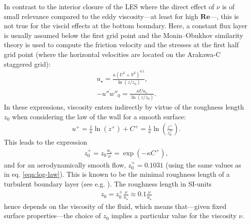 \documentclass[a4paper,11pt]{article}
\newcommand{\RE}{\mathbf{Re}}
\begin{document}
\label{low-bound}

In contrast to the interior closure of the LES where the direct effect of $\nu$ is of small relevance compared to the eddy viscosity---at least for high $\RE$---, this is not true for the viscid effects at the bottom boundary. Here, a constant flux layer is usually assumed below the first grid point and the Monin--Obukhov similarity theory is used to compute the friction velocity and the stresses at the first half grid point (where the horizontal velocities are located on the Arakawa-C staggered grid):
\begin{align}\label{most}
  u_\star = \frac{\kappa(U^2+V^2)^{0.5}}{\ln\left(z/z_0\right)},\\
  -\overline{u''w''}_0 = \frac{\kappa Uu_\star}{\ln\left(z/z_0\right)}.
\end{align}
In these expressions, viscosity enters indirectly by virtue of the roughness length $z_0$ when considering the law of the wall for a smooth surface:
\begin{align}
  u^+ = \frac{1}{\kappa}\ln(z^+) + C^+ = \frac{1}{\kappa}\ln\left(\frac{z^+}{z_0^+}\right).
\end{align}
This leads to the expression
\begin{align}
	z_0^+ = z_0\frac{u_\star}{\nu} = \exp\left(-\kappa C^+\right),
\end{align}
and for an aerodynamically smooth flow, $z_0^+ = 0.1031$ (using the same values as in eq. \ref{eqn:log-law}). This is known to be the minimal roughness length of a turbulent boundary layer (see e.g. \cite{kraus2008grundlagen}). The roughness length in SI-units 
\begin{align}
	z_0 = z_0^+\frac{\nu}{u_\star}\approx 0.1\frac{\nu}{u_\star}
\end{align}
hence depends on the viscosity of the fluid, which means that---given fixed surface properties---the choice of $z_0$ implies a particular value for the viscosity $\nu$.
\end{document}
